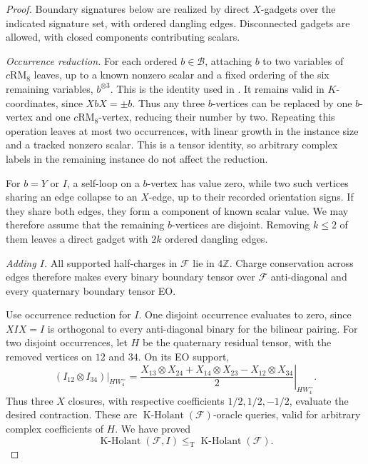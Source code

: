 \documentclass[11pt,letterpaper,onecolumn]{article}
\theoremstyle{plain}
\theoremstyle{definition}
\theoremstyle{remark}
\newcommand{\cF}{\mathcal F}
\newcommand{\KHolant}{\operatorname{K\text{-}Holant}}
\newcommand{\RMcore}{\mathrm{RM}_8}
\newcommand{\leT}{\leq_{\mathrm T}}
\begin{document}
	\begin{proof}
        Boundary signatures below are realized by direct \(X\)-gadgets over
        the indicated signature set, with ordered dangling edges. Disconnected
        gadgets are allowed, with closed components contributing scalars.
		
		\smallskip
		\noindent\emph{Occurrence reduction.}
		For each ordered \(b\in\mathcal B\), attaching \(b\) to two variables of
		\(c\RMcore\) leaves, up to a known nonzero scalar and a fixed ordering of
		the six remaining variables, \(b^{\otimes3}\).
		This is the identity used in
		\cite[full version, Lemma~8.9]{ShaoCai2020}.
		It remains valid in \(K\)-coordinates, since
		\(XbX=\pm b\).  Thus any three \(b\)-vertices can be replaced by one
		\(b\)-vertex and one \(c\RMcore\)-vertex, reducing their number by two.
		Repeating this operation leaves at most two occurrences, with linear
		growth in the instance size and a tracked nonzero scalar.
		This is a tensor identity, so arbitrary complex labels in the remaining
		instance do not affect the reduction.
		
		For \(b=Y\) or \(I\), a self-loop on a \(b\)-vertex has value zero,
		while two such vertices sharing an edge collapse to an \(X\)-edge,
		up to their recorded orientation signs.  If they share both edges, they
		form a component of known scalar value.  We may therefore assume that
		the remaining \(b\)-vertices are disjoint.  Removing \(k\le2\) of them
		leaves a direct gadget with \(2k\) ordered dangling edges.
		
		\smallskip
		\noindent\emph{Adding \(I\).}
        All supported half-charges in \(\cF\) lie in \(4\mathbb Z\).
        Charge conservation across edges therefore makes every binary
        boundary tensor over \(\cF\) anti-diagonal and every quaternary
        boundary tensor EO.
		
		Use occurrence reduction for \(I\).  One disjoint occurrence evaluates
		to zero, since \(XIX=I\) is orthogonal to every anti-diagonal binary for
		the bilinear pairing.  For two disjoint occurrences, let \(H\) be the
		quaternary residual tensor, with the removed vertices on \(12\) and \(34\).
		On its EO support,
		\begin{equation}
		\left.(I_{12}\otimes I_{34})\right|_{HW_4^=}
		=
		\left.
		\frac{X_{13}\otimes X_{24}
			+X_{14}\otimes X_{23}
			-X_{12}\otimes X_{34}}{2}
		\right|_{HW_4^=}.
		\label{eq:q8-equality-eo-closures}
		\end{equation}
		Thus three \(X\) closures, with respective coefficients
		\(1/2,1/2,-1/2\), evaluate the desired contraction.  These are
		\(\KHolant(\cF)\)-oracle queries, valid for arbitrary complex
		coefficients of \(H\).  We have proved
        \begin{equation}
        \KHolant(\cF,I)\leT\KHolant(\cF).
        \label{eq:q8-equality-reduction}
        \end{equation}


\end{proof}
\end{document}
